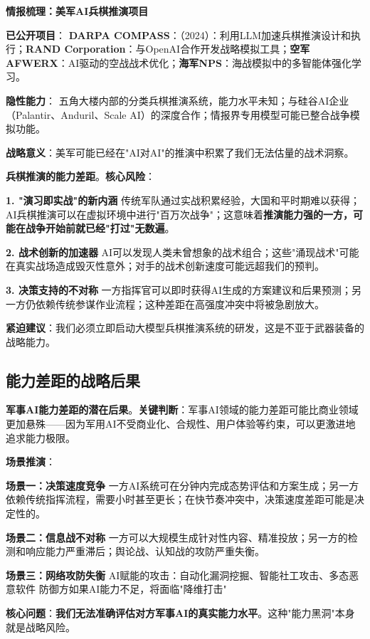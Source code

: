 \textbf{情报梳理：美军AI兵棋推演项目}

\textbf{已公开项目}：
\textbf{DARPA COMPASS}：（2024）：利用LLM加速兵棋推演设计和执行；\textbf{RAND Corporation}：与OpenAI合作开发战略模拟工具；\textbf{空军AFWERX}：AI驱动的空战战术优化；\textbf{海军NPS}：海战模拟中的多智能体强化学习。

\textbf{隐性能力}：
五角大楼内部的分类兵棋推演系统，能力水平未知；与硅谷AI企业（Palantir、Anduril、Scale AI）的深度合作；情报界专用模型可能已整合战争模拟功能。

\textbf{战略意义}：美军可能已经在"AI对AI"的推演中积累了我们无法估量的战术洞察。

\textbf{兵棋推演的能力差距}。\textbf{核心风险}：

\textbf{1. "演习即实战"的新内涵}
传统军队通过实战积累经验，大国和平时期难以获得；AI兵棋推演可以在虚拟环境中进行"百万次战争"；这意味着\textbf{推演能力强的一方，可能在战争开始前就已经"打过"无数遍}。

\textbf{2. 战术创新的加速器}
AI可以发现人类未曾想象的战术组合；这些"涌现战术"可能在真实战场造成毁灭性意外；对手的战术创新速度可能远超我们的预判。

\textbf{3. 决策支持的不对称}
一方指挥官可以即时获得AI生成的方案建议和后果预测；另一方仍依赖传统参谋作业流程；这种差距在高强度冲突中将被急剧放大。

\textbf{紧迫建议}：我们必须立即启动大模型兵棋推演系统的研发，这是不亚于武器装备的战略能力。

\subsection{能力差距的战略后果}

\textbf{军事AI能力差距的潜在后果}。\textbf{关键判断}：军事AI领域的能力差距可能比商业领域更加悬殊——因为军用AI不受商业化、合规性、用户体验等约束，可以更激进地追求能力极限。

\textbf{场景推演}：

\textbf{场景一：决策速度竞争}
一方AI系统可在分钟内完成态势评估和方案生成；另一方依赖传统指挥流程，需要小时甚至更长；在快节奏冲突中，决策速度差距可能是决定性的。

\textbf{场景二：信息战不对称}
一方可以大规模生成针对性内容、精准投放；另一方的检测和响应能力严重滞后；舆论战、认知战的攻防严重失衡。

\textbf{场景三：网络攻防失衡}
AI赋能的攻击：自动化漏洞挖掘、智能社工攻击、多态恶意软件 防御方如果AI能力不足，将面临"降维打击"

\textbf{核心问题}：\textbf{我们无法准确评估对方军事AI的真实能力水平}。这种"能力黑洞"本身就是战略风险。

